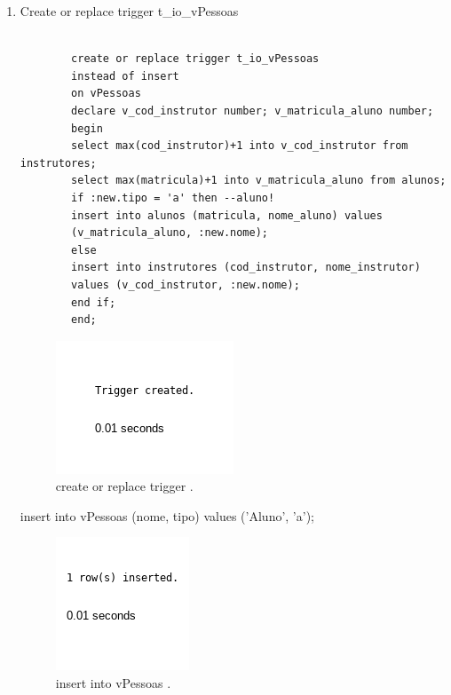 \documentclass[
article,			%
11pt,				%
oneside,			%
a4paper,			%
english,			%
brazil,				%
sumario=tradicional
]{abntex2}
\begin{document}
	
	\frenchspacing 
	
	
	\maketitle
	\begin{enumerate}
	
	
		\item Create or replace trigger t\_io\_vPessoas
				\begin{verbatim}
		
		create or replace trigger t_io_vPessoas
		instead of insert
		on vPessoas
		declare v_cod_instrutor number; v_matricula_aluno number;
		begin
		select max(cod_instrutor)+1 into v_cod_instrutor from instrutores;
		select max(matricula)+1 into v_matricula_aluno from alunos;
		if :new.tipo = 'a' then --aluno!
		insert into alunos (matricula, nome_aluno) values
		(v_matricula_aluno, :new.nome);
		else
		insert into instrutores (cod_instrutor, nome_instrutor)
		values (v_cod_instrutor, :new.nome);
		end if;
		end;
			 \end{verbatim}
			 \begin{center}
			 	\begin{figure}[H]
			 		\centering
			 		\includegraphics[scale=0.5]{./imagens/22.png}
			 		\caption{	create or replace trigger .}
			 		\label{rota-1}
			 	\end{figure}
			 \end{center}
					
			insert into vPessoas (nome, tipo) values ('Aluno', 'a');

					\begin{center}
					\begin{figure}[H]
						\centering
						\includegraphics[scale=0.5]{./imagens/23.png}
						\caption{insert into vPessoas  .}
						\label{rota-1}
					\end{figure}
				\end{center}


\end{enumerate}
\end{document}
